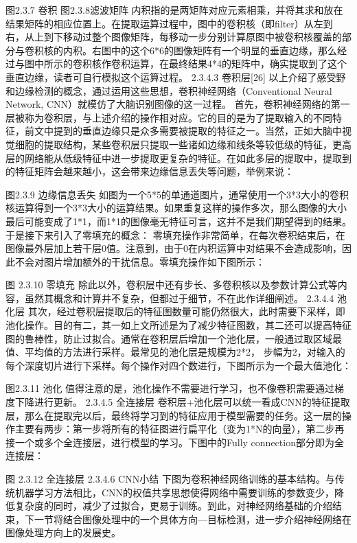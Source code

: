 图2.3.7 卷积                       图2.3.8滤波矩阵
内积指的是两矩阵对应元素相乘，并将其求和放在结果矩阵的相应位置上。在提取运算过程中，图中的卷积核（即filter）从左到右，从上到下移动过整个图像矩阵，每移动一步分别计算原图中被卷积核覆盖的部分与卷积核的内积。右图中的这个6*6的图像矩阵有一个明显的垂直边缘，那么经过与图中所示的卷积核作卷积运算，在最终结果4*4的矩阵中，确实提取到了这个垂直边缘，读者可自行模拟这个运算过程。
2.3.4.3 卷积层[26]
以上介绍了感受野和边缘检测的概念，通过运用这些思想，卷积神经网络（Conventional Neural Network, CNN）就模仿了大脑识别图像的这一过程。
	首先，卷积神经网络的第一层被称为卷积层，与上述介绍的操作相对应。它的目的是为了提取输入的不同特征，前文中提到的垂直边缘只是众多需要被提取的特征之一。当然，正如大脑中视觉细胞的提取结构，某些卷积层只提取一些诸如边缘和线条等较低级的特征，更高层的网络能从低级特征中进一步提取更复杂的特征。在如此多层的提取中，提取到的特征矩阵会越来越小，这会带来边缘信息丢失等问题，举例来说：

图2.3.9 边缘信息丢失
如图为一个5*5的单通道图片，通常使用一个3*3大小的卷积核运算得到一个3*3大小的运算结果。如果重复这样的操作多次，那么图像的大小最后可能变成了1*1，而1*1的图像毫无特征可言，这并不是我们期望得到的结果。于是接下来引入了零填充的概念：
	零填充操作非常简单，在每次卷积结束后，在图像最外层加上若干层0值。注意到，由于0在内积运算中对结果不会造成影响，因此不会对图片增加额外的干扰信息。零填充操作如下图所示：

图 2.3.10 零填充
除此以外，卷积层中还有步长、多卷积核以及参数计算公式等内容，虽然其概念和计算并不复杂，但都过于细节，不在此作详细阐述。
2.3.4.4 池化层
	其次，经过卷积层提取后的特征图数量可能仍然很大，此时需要下采样，即池化操作。目的有二，其一如上文所述是为了减少特征图数，其二还可以提高特征图的鲁棒性，防止过拟合。通常在卷积层后增加一个池化层，一般通过取区域最值、平均值的方法进行采样。最常见的池化层是规模为2*2， 步幅为2，对输入的每个深度切片进行下采样。每个操作对四个数进行，下图所示为一个最大值池化：

图2.3.11 池化
值得注意的是，池化操作不需要进行学习，也不像卷积需要通过梯度下降进行更新。
2.3.4.5 全连接层
卷积层+池化层可以统一看成CNN的特征提取层，那么在提取完以后，最终将学习到的特征应用于模型需要的任务。这一层的操作主要有两步：第一步将所有的特征图进行扁平化（变为1*N的向量），第二步再接一个或多个全连接层，进行模型的学习。下图中的Fully connection部分即为全连接层：

图 2.3.12 全连接层
2.3.4.6 CNN小结
下图为卷积神经网络训练的基本结构。与传统机器学习方法相比，CNN的权值共享思想使得网络中需要训练的参数变少，降低复杂度的同时，减少了过拟合，更易于训练。到此，对神经网络基础的介绍结束，下一节将结合图像处理中的一个具体方向---目标检测，进一步介绍神经网络在图像处理方向上的发展史。

